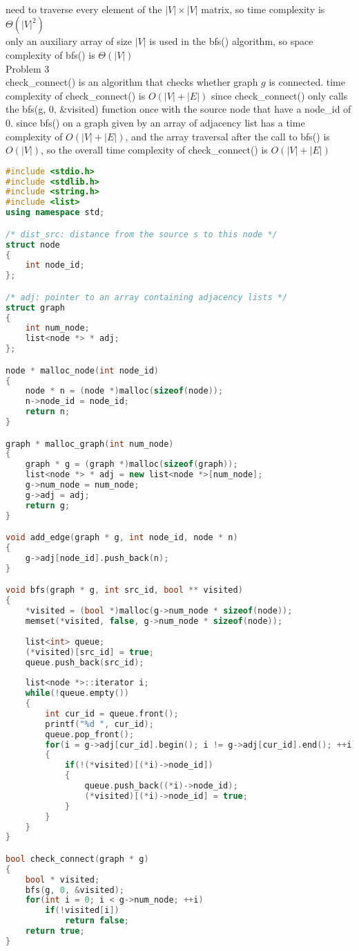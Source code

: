 \documentclass[12pt,border=4pt,multi]{article} %
\begin{document}
\leavevmode
\\
\\
\\
need to traverse every element of the $|V| \times |V|$ matrix, so time complexity is $\Theta(|V|^2)$\\
only an auxiliary array of size $|V|$ is used in the bfs() algorithm, so space complexity of bfs() is $\Theta(|V|)$\\
\newpage
\noindent
Problem 3\\
check\_connect() is an algorithm that checks whether graph $g$ is connected. time complexity of check\_connect() is $O(|V| + |E|)$ since check\_connect() only calls the bfs(g, 0, \&visited) function once with the source node that have a node\_id of 0. since bfs() on a graph given by an array of adjacency list has a time complexity of $O(|V| + |E|)$, and the array traversal after the call to bfs() is $O(|V|)$, so the overall time complexity of check\_connect() is $O(|V| + |E|)$
\begin{lstlisting}[language = c++]
#include <stdio.h>
#include <stdlib.h>
#include <string.h>
#include <list>
using namespace std;

/* dist_src: distance from the source s to this node */
struct node
{
    int node_id;
};

/* adj: pointer to an array containing adjacency lists */
struct graph
{
    int num_node;
    list<node *> * adj;
};

node * malloc_node(int node_id)
{
    node * n = (node *)malloc(sizeof(node));
    n->node_id = node_id;
    return n;
}

graph * malloc_graph(int num_node)
{
    graph * g = (graph *)malloc(sizeof(graph));
    list<node *> * adj = new list<node *>[num_node];
    g->num_node = num_node;
    g->adj = adj;
    return g;
}

void add_edge(graph * g, int node_id, node * n)
{
    g->adj[node_id].push_back(n);   
}

void bfs(graph * g, int src_id, bool ** visited)
{
    *visited = (bool *)malloc(g->num_node * sizeof(node));
    memset(*visited, false, g->num_node * sizeof(node));
    
    list<int> queue;
    (*visited)[src_id] = true;
    queue.push_back(src_id);
    
    list<node *>::iterator i;
    while(!queue.empty())
    {
        int cur_id = queue.front();
        printf("%d ", cur_id);
        queue.pop_front();
        for(i = g->adj[cur_id].begin(); i != g->adj[cur_id].end(); ++i)
        {
            if(!(*visited)[(*i)->node_id])
            {
                queue.push_back((*i)->node_id);
                (*visited)[(*i)->node_id] = true;
            }
        }
    }
}

bool check_connect(graph * g)
{
    bool * visited;
    bfs(g, 0, &visited);
    for(int i = 0; i < g->num_node; ++i)
        if(!visited[i])
            return false;
    return true;
}
\end{lstlisting}
\end{document}
